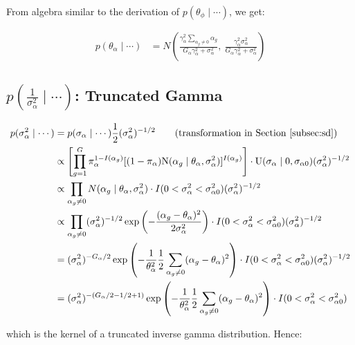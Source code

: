 \documentclass{article}\usepackage{graphicx, color}
\begin{document}
\begin{flushleft}
From algebra similar to the derivation of $p(\theta_\phi \mid \cdots)$, we get:

\begin{align*}
p(\theta_\alpha \mid \cdots) &= N \left ( \frac{\gamma_\alpha^2 \sum_{\alpha_g \ne 0} \alpha_g}{G_\alpha \gamma_\alpha^2 + \sigma_\alpha^2}, \ \frac{\gamma_\alpha^2 \sigma_\alpha^2}{G_\alpha \gamma_\alpha^2 + \sigma_\alpha^2} \right ) 
\end{align*}








\subsection{$p \left (\frac{1}{\sigma_\alpha^2} \mid \cdots \right )$: Truncated Gamma}

\begin{align*}
p(\sigma_\alpha^2 \mid \cdots ) & = p(\sigma_\alpha \mid \cdots) \frac{1}{2} (\sigma_\alpha^2)^{-1/2} \qquad \text{(transformation in Section \ref{subsec:sd})} \\
&\propto \left [ \prod_{g = 1}^G  \pi_\alpha^{1-I(\alpha_g)}[(1- \pi_\alpha)\text{N}(\alpha_g \mid \theta_\alpha, \sigma_\alpha^2)]^{I(\alpha_g)} \right ]  \cdot \text{U}(\sigma_\alpha \mid 0, \sigma_{\alpha 0})  (\sigma_\alpha^2)^{-1/2} \\
&\propto \prod_{\alpha_g \ne 0} N(\alpha_g \mid \theta_\alpha, \sigma_\alpha^2) \cdot I(0 < \sigma_\alpha^2 < \sigma_{\alpha 0}^2 )  (\sigma_\alpha^2)^{-1/2} \\
&\propto \prod_{\alpha_g \ne 0} (\sigma_\alpha^2)^{-1/2} \exp \left ( -\frac{(\alpha_g - \theta_\alpha)^2}{2 \sigma_\alpha^2}\right ) \cdot I(0 < \sigma_\alpha^2 < \sigma_{\alpha 0}^2 )  (\sigma_\alpha^2)^{-1/2} \\
&= (\sigma_\alpha^2)^{-G_\alpha/2} \exp \left ( -\frac{1}{\theta_\alpha^2} \frac{1}{2} \sum_{\alpha_g \ne 0} (\alpha_g - \theta_\alpha)^2 \right ) \cdot I(0 < \sigma_\alpha^2 < \sigma_{\alpha 0}^2 )  (\sigma_\alpha^2)^{-1/2} \\
&= (\sigma_\alpha^2)^{-(G_\alpha/2 -1 /2 + 1)} \exp \left ( -\frac{1}{\theta_\alpha^2} \frac{1}{2} \sum_{\alpha_g \ne 0} (\alpha_g - \theta_\alpha)^2 \right ) \cdot I(0 < \sigma_\alpha^2 < \sigma_{\alpha 0}^2 ) \\
\end{align*}

which is the kernel of a truncated inverse gamma distribution. Hence:


\end{flushleft}
\end{document}
